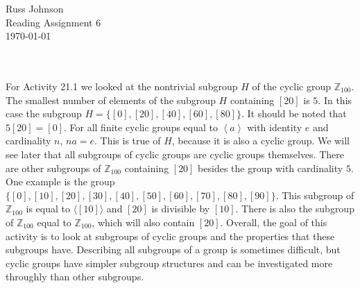 \documentclass[11pt,a4paper]{article}
\begin{document}
\begin{flushright}
Russ Johnson\\
Reading Assignment 6\\
\today\\
\end{flushright}
~\\
~\\

For Activity 21.1 we looked at the nontrivial subgroup $H$ of the cyclic group $\mathbb{Z}_{100}$. The smallest number of elements of the subgroup $H$ containing $[20]$ is $5$. In this case the subgroup $H=\{[0],[20],[40],[60],[80]\}$. It should be noted that $5[20]=[0]$. For all finite cyclic groups equal to $\left\langle a \right\rangle$ with identity $e$ and cardinality $n$, $na=e$. This is true of $H$, because it is also a cyclic group. We will see later that all subgroups of cyclic groups are cyclic groups themselves. There are other subgroups of $\mathbb{Z}_{100}$ containing $[20]$ besides the group with cardinality $5$. One example is the group $\{[0],[10],[20],[30],[40],[50],[60],[70],[80],[90]\}$. This subgroup of $\mathbb{Z}_{100}$ is equal to $\langle [10]\rangle$ and $[20]$ is divisible by $[10]$. There is also the subgroup of $\mathbb{Z}_{100}$ equal to $\mathbb{Z}_{100}$, which will also contain $[20]$. Overall, the goal of this activity is to look at subgroups of cyclic groups and the properties that these subgroups have. Describing all subgroups of a group is sometimes difficult, but cyclic groups have simpler subgroup structures and can be investigated more throughly than other subgroups.
\end{document}
